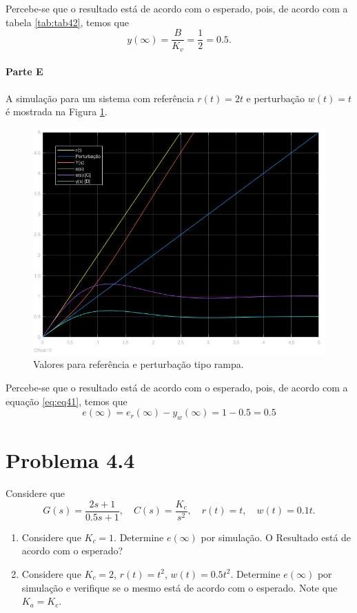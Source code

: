 \documentclass[
]{book}
\providecommand{\tightlist}{%
  \setlength{\itemsep}{0pt}\setlength{\parskip}{0pt}}
\theoremstyle{definition}
\theoremstyle{definition}
\theoremstyle{definition}
\theoremstyle{remark}
\begin{document}
Percebe-se que o resultado está de acordo com o esperado, pois, de acordo com a tabela \ref{tab:tab42}, temos que
\[
y(\infty) = \frac {B}{K_v} = \frac {1}{2} = 0.5.
\]

\hypertarget{parte-e}{%
\paragraph*{Parte E}\label{parte-e}}

A simulação para um sistema com referência \(r(t) = 2t\) e perturbação \(w(t) = t\) é mostrada na Figura \ref{fig:fig43E1}.

\begin{figure}
\includegraphics[width=0.8\linewidth]{Imagens/Lab4/Resolução/prob3E1} \caption{Valores para referência e perturbação tipo rampa.}\label{fig:fig43E1}
\end{figure}

Percebe-se que o resultado está de acordo com o esperado, pois, de acordo com a equação \eqref{eq:eq41}, temos que
\[
e(\infty) = e_r(\infty) - y_w(\infty) = 1 - 0.5 = 0.5
\]

\hypertarget{problema-4.4}{%
\section*{Problema 4.4}\label{problema-4.4}}

Considere que
\[
G(s) = \frac {2s +1}{0.5s+1}, \quad C(s) = \frac {K_c}{s^2}, \quad r(t) = t, \quad w(t) = 0.1t.
\]

\begin{enumerate}
\def\labelenumi{\alph{enumi}.}
\tightlist
\item
  Considere que \(K_c =1\). Determine \(e(\infty)\) por simulação. O Resultado está de acordo com o esperado?
\item
  Considere que \(K_c =2\), \(r(t) = t^2\), \(w(t) = 0.5t^2\). Determine \(e(\infty)\) por simulação e verifique se o mesmo está de acordo com o esperado. Note que \(K_a = K_c\).
\end{enumerate}
\end{document}
